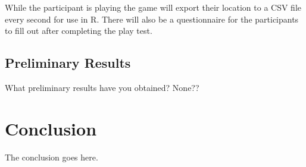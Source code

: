 \documentclass[journal]{IEEEtran}
\begin{document}
While the participant is playing the game will export their location to a CSV file every second for use in R. There will also be a questionnaire for the participants to fill out after completing the play test.


\subsection{Preliminary Results}
What preliminary results have you obtained?
None??


\section{Conclusion}
The conclusion goes here.







\end{document}
